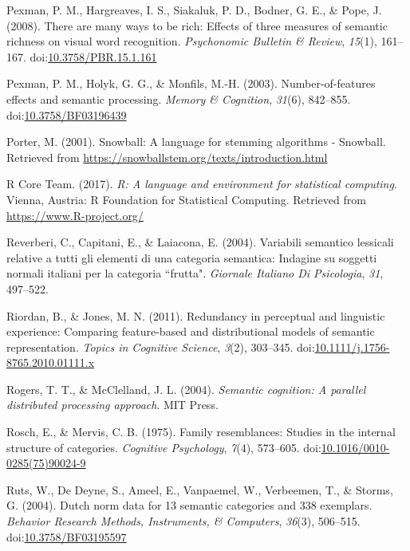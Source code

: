 \documentclass[english,,man]{apa6}
\begin{document}
\leavevmode\hypertarget{ref-Pexman2008}{}%
Pexman, P. M., Hargreaves, I. S., Siakaluk, P. D., Bodner, G. E., \& Pope, J. (2008). There are many ways to be rich: Effects of three measures of semantic richness on visual word recognition. \emph{Psychonomic Bulletin \& Review}, \emph{15}(1), 161--167. doi:\href{https://doi.org/10.3758/PBR.15.1.161}{10.3758/PBR.15.1.161}

\leavevmode\hypertarget{ref-Pexman2003}{}%
Pexman, P. M., Holyk, G. G., \& Monfils, M.-H. (2003). Number-of-features effects and semantic processing. \emph{Memory \& Cognition}, \emph{31}(6), 842--855. doi:\href{https://doi.org/10.3758/BF03196439}{10.3758/BF03196439}

\leavevmode\hypertarget{ref-Porter2001}{}%
Porter, M. (2001). Snowball: A language for stemming algorithms - Snowball. Retrieved from \url{https://snowballstem.org/texts/introduction.html}

\leavevmode\hypertarget{ref-R-base}{}%
R Core Team. (2017). \emph{R: A language and environment for statistical computing}. Vienna, Austria: R Foundation for Statistical Computing. Retrieved from \url{https://www.R-project.org/}

\leavevmode\hypertarget{ref-Reverberi2004}{}%
Reverberi, C., Capitani, E., \& Laiacona, E. (2004). Variabili semantico lessicali relative a tutti gli elementi di una categoria semantica: Indagine su soggetti normali italiani per la categoria ``frutta". \emph{Giornale Italiano Di Psicologia}, \emph{31}, 497--522.

\leavevmode\hypertarget{ref-Riordan2011}{}%
Riordan, B., \& Jones, M. N. (2011). Redundancy in perceptual and linguistic experience: Comparing feature-based and distributional models of semantic representation. \emph{Topics in Cognitive Science}, \emph{3}(2), 303--345. doi:\href{https://doi.org/10.1111/j.1756-8765.2010.01111.x}{10.1111/j.1756-8765.2010.01111.x}

\leavevmode\hypertarget{ref-Rogers2004}{}%
Rogers, T. T., \& McClelland, J. L. (2004). \emph{Semantic cognition: A parallel distributed processing approach}. MIT Press.

\leavevmode\hypertarget{ref-Rosch1975}{}%
Rosch, E., \& Mervis, C. B. (1975). Family resemblances: Studies in the internal structure of categories. \emph{Cognitive Psychology}, \emph{7}(4), 573--605. doi:\href{https://doi.org/10.1016/0010-0285(75)90024-9}{10.1016/0010-0285(75)90024-9}

\leavevmode\hypertarget{ref-Ruts2004}{}%
Ruts, W., De Deyne, S., Ameel, E., Vanpaemel, W., Verbeemen, T., \& Storms, G. (2004). Dutch norm data for 13 semantic categories and 338 exemplars. \emph{Behavior Research Methods, Instruments, \& Computers}, \emph{36}(3), 506--515. doi:\href{https://doi.org/10.3758/BF03195597}{10.3758/BF03195597}
\end{document}
